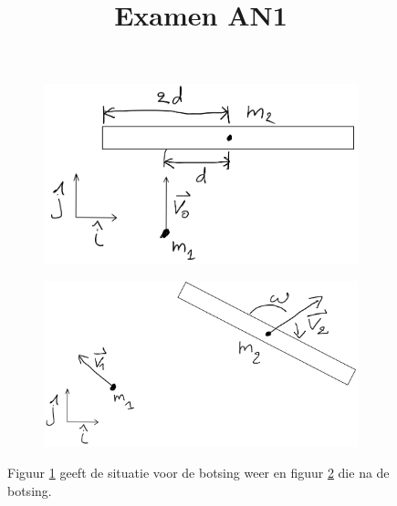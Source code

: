 \documentclass[11pt]{article}
\title{Examen AN1}
\begin{document}
\begin{figure}
	\centering
	\begin{subfigure}[b]{0.45\textwidth}
		\centering
		\includegraphics[width=\textwidth]{VoorBotsing}
		\caption{}
		\label{fig:VoorBotsing}
	\end{subfigure}
	\hfill
	\begin{subfigure}[b]{0.45\textwidth}
		\centering
		\includegraphics[width=\textwidth]{NaBotsing}
		\caption{}
		\label{fig:NaBotsing}
	\end{subfigure}
	\caption{Figuur \ref{fig:VoorBotsing} geeft de situatie voor de botsing weer en figuur \ref{fig:NaBotsing} die na de botsing.}
	\label{fig:Botsing}
\end{figure}
\end{document}

